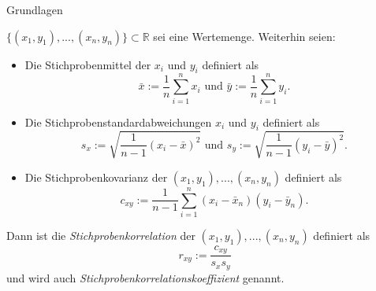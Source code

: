 \documentclass[
  8pt,
  ignorenonframetext,
]{beamer}
\begin{document}
\begin{frame}{Grundlagen}
\protect\hypertarget{grundlagen-4}{}
\footnotesize
\begin{definition}[Stichprobenkorrelation]
\justifying
$\{(x_1,y_1),...,(x_n,y_n)\} \subset \mathbb{R}$ sei eine Wertemenge. Weiterhin seien:
\begin{itemize}
\item Die Stichprobenmittel der $x_i$ und $y_i$ definiert als
\begin{equation}
\bar{x} := \frac{1}{n}\sum_{i=1}^n x_i
\mbox{ und }
\bar{y} := \frac{1}{n}\sum_{i=1}^n y_i.
\end{equation}
\item Die Stichprobenstandardabweichungen $x_i$ und $y_i$ definiert als
\begin{equation}
s_x := \sqrt{\frac{1}{n-1}(x_i - \bar{x})^2}
\mbox{ und }
s_y := \sqrt{\frac{1}{n-1}(y_i - \bar{y})^2}.
\end{equation}
\item Die Stichprobenkovarianz der $(x_1,y_1),...,(x_n,y_n)$ definiert als
\begin{equation}
c_{xy} := \frac{1}{n-1}\sum_{i=1}^n (x_i - \bar{x}_n)(y_i - \bar{y}_n).
\end{equation}
\end{itemize}
Dann ist die \textit{Stichprobenkorrelation} der $(x_1,y_1),...,(x_n,y_n)$ definiert als
\begin{equation}
r_{xy} := \frac{c_{xy}}{s_xs_y}
\end{equation}
und  wird auch \textit{Stichprobenkorrelationskoeffizient} genannt.
\end{definition}
\end{frame}
\end{document}
